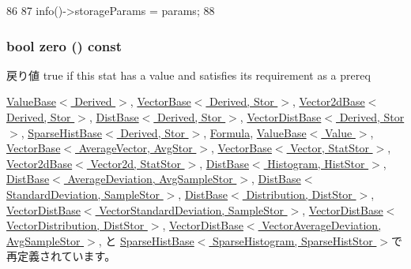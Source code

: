 \begin{DoxyCode}
86 {
87     info()->storageParams = params;
88 }
\end{DoxyCode}
\hypertarget{classStats_1_1InfoAccess_a4e72b01b727d3165e75cba84eb507491}{
\subsubsection[{zero}]{\setlength{\rightskip}{0pt plus 5cm}bool zero () const}}
\label{classStats_1_1InfoAccess_a4e72b01b727d3165e75cba84eb507491}
\begin{DoxyReturn}{戻り値}
true if this stat has a value and satisfies its requirement as a prereq 
\end{DoxyReturn}


\hyperlink{classStats_1_1ValueBase_a4e72b01b727d3165e75cba84eb507491}{ValueBase$<$ Derived $>$}, \hyperlink{classStats_1_1VectorBase_a4e72b01b727d3165e75cba84eb507491}{VectorBase$<$ Derived, Stor $>$}, \hyperlink{classStats_1_1Vector2dBase_a4e72b01b727d3165e75cba84eb507491}{Vector2dBase$<$ Derived, Stor $>$}, \hyperlink{classStats_1_1DistBase_a4e72b01b727d3165e75cba84eb507491}{DistBase$<$ Derived, Stor $>$}, \hyperlink{classStats_1_1VectorDistBase_a4e72b01b727d3165e75cba84eb507491}{VectorDistBase$<$ Derived, Stor $>$}, \hyperlink{classStats_1_1SparseHistBase_a4e72b01b727d3165e75cba84eb507491}{SparseHistBase$<$ Derived, Stor $>$}, \hyperlink{classStats_1_1Formula_a4e72b01b727d3165e75cba84eb507491}{Formula}, \hyperlink{classStats_1_1ValueBase_a4e72b01b727d3165e75cba84eb507491}{ValueBase$<$ Value $>$}, \hyperlink{classStats_1_1VectorBase_a4e72b01b727d3165e75cba84eb507491}{VectorBase$<$ AverageVector, AvgStor $>$}, \hyperlink{classStats_1_1VectorBase_a4e72b01b727d3165e75cba84eb507491}{VectorBase$<$ Vector, StatStor $>$}, \hyperlink{classStats_1_1Vector2dBase_a4e72b01b727d3165e75cba84eb507491}{Vector2dBase$<$ Vector2d, StatStor $>$}, \hyperlink{classStats_1_1DistBase_a4e72b01b727d3165e75cba84eb507491}{DistBase$<$ Histogram, HistStor $>$}, \hyperlink{classStats_1_1DistBase_a4e72b01b727d3165e75cba84eb507491}{DistBase$<$ AverageDeviation, AvgSampleStor $>$}, \hyperlink{classStats_1_1DistBase_a4e72b01b727d3165e75cba84eb507491}{DistBase$<$ StandardDeviation, SampleStor $>$}, \hyperlink{classStats_1_1DistBase_a4e72b01b727d3165e75cba84eb507491}{DistBase$<$ Distribution, DistStor $>$}, \hyperlink{classStats_1_1VectorDistBase_a4e72b01b727d3165e75cba84eb507491}{VectorDistBase$<$ VectorStandardDeviation, SampleStor $>$}, \hyperlink{classStats_1_1VectorDistBase_a4e72b01b727d3165e75cba84eb507491}{VectorDistBase$<$ VectorDistribution, DistStor $>$}, \hyperlink{classStats_1_1VectorDistBase_a4e72b01b727d3165e75cba84eb507491}{VectorDistBase$<$ VectorAverageDeviation, AvgSampleStor $>$}, と \hyperlink{classStats_1_1SparseHistBase_a4e72b01b727d3165e75cba84eb507491}{SparseHistBase$<$ SparseHistogram, SparseHistStor $>$}で再定義されています。


